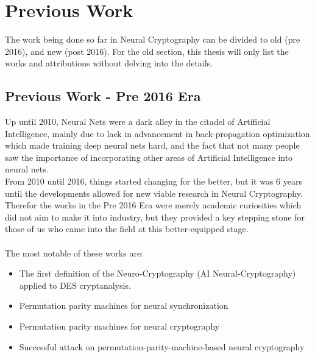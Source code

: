 \documentclass[a4paper, 12pt]{report}
\begin{document}
\section{\textbf{Previous Work}}
The work being done so far in Neural Cryptography can be divided to old (pre 2016), and new (post 2016). For the old section, this thesis will only list the works and attributions without delving into the details.
\subsection{\textbf{Previous Work - Pre 2016 Era}}
Up until 2010, Neural Nets were a dark alley in the citadel of Artificial Intelligence, mainly due to lack in advancement in back-propagation optimization which made training deep neural nets hard, and the fact that not many people saw the importance of incorporating other areas of Artificial Intelligence into neural nets.\\ From 2010 until 2016, things started changing for the better, but it was 6 years until the developments allowed for new viable research in Neural Cryptography.\\
Therefor the works in the Pre 2016 Era were merely academic curiosities which did not aim to make it into industry, but they provided a key stepping stone for those of us who came into the field at this better-equipped stage.\\\\
The most notable of these works are:
\begin{itemize}[nosep]
	\item The first definition of the Neuro-Cryptography (AI Neural-Cryptography) applied to DES cryptanalysis. ~\citep{s.dourlens.free.fr/AppliedNeuroCryptography}
	\item Permutation parity machines for neural synchronization ~\citep{1751-8121-42-19-195002}
	\item Permutation parity machines for neural cryptography ~\citep{PhysRevE.81.066117}
	\item Successful attack on permutation-parity-machine-based neural cryptography ~\citep{PhysRevE.85.025101}
\end{itemize}
\end{document}
